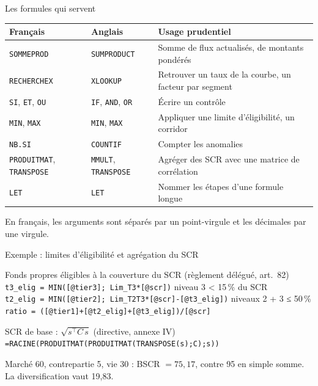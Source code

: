\documentclass[10pt,aspectratio=169]{beamer}
\newcommand{\fx}[1]{\texttt{\small #1}}
\begin{document}
\begin{frame}{Les formules qui servent}
\begin{table}
\centering
\small
\renewcommand{\arraystretch}{1.3}
\begin{tabular}{lll}
\toprule
\textbf{Français} & \textbf{Anglais} & \textbf{Usage prudentiel} \\
\midrule
\fx{SOMMEPROD} & \fx{SUMPRODUCT} & Somme de flux actualisés, de montants pondérés \\
\fx{RECHERCHEX} & \fx{XLOOKUP} & Retrouver un taux de la courbe, un facteur par segment \\
\fx{SI}, \fx{ET}, \fx{OU} & \fx{IF}, \fx{AND}, \fx{OR} & Écrire un contrôle \\
\fx{MIN}, \fx{MAX} & \fx{MIN}, \fx{MAX} & Appliquer une limite d'éligibilité, un corridor \\
\fx{NB.SI} & \fx{COUNTIF} & Compter les anomalies \\
\fx{PRODUITMAT}, \fx{TRANSPOSE} & \fx{MMULT}, \fx{TRANSPOSE} & Agréger des SCR avec une matrice de corrélation \\
\fx{LET} & \fx{LET} & Nommer les étapes d'une formule longue \\
\bottomrule
\end{tabular}
\end{table}
\small En français, les arguments sont séparés par un point-virgule et les décimales par une virgule.
\end{frame}

\begin{frame}{Exemple : limites d'éligibilité et agrégation du SCR}
\begin{block}{Fonds propres éligibles à la couverture du SCR (règlement délégué, art.~82)}
\small
\fx{t3\_elig = MIN([@tier3]; Lim\_T3*[@scr])} \hfill niveau 3 < 15\,\% du SCR\\
\fx{t2\_elig = MIN([@tier2]; Lim\_T2T3*[@scr]-[@t3\_elig])} \hfill niveaux 2 + 3 ≤ 50\,\%\\
\fx{ratio = ([@tier1]+[@t2\_elig]+[@t3\_elig])/[@scr]}
\end{block}
\begin{block}{SCR de base : $\sqrt{s^\top C\, s}$ (directive, annexe IV)}
\small
\fx{=RACINE(PRODUITMAT(PRODUITMAT(TRANSPOSE(s);C);s))}

\smallskip
Marché 60, contrepartie 5, vie 30 : BSCR $= 75{,}17$, contre 95 en simple somme. La
diversification vaut 19,83.
\end{block}
\end{frame}
\end{document}
